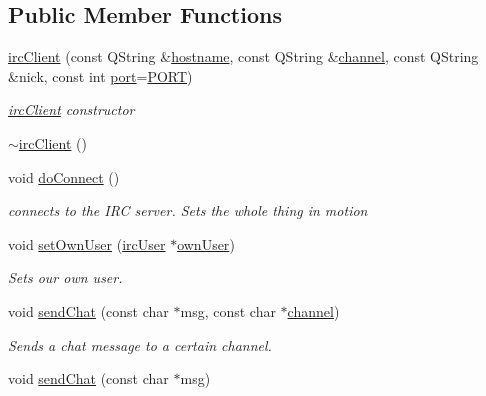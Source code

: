 \subsection*{Public Member Functions}
\begin{DoxyCompactItemize}
\item 
\hyperlink{classserver_1_1irc_client_a0f263c3a5ae9d82109842518b4866ab5}{irc\-Client} (const Q\-String \&\hyperlink{classserver_1_1irc_client_a8a5a50ebf84488f46df38bfba2c692bd}{hostname}, const Q\-String \&\hyperlink{classserver_1_1irc_client_a01d41f735fe9f0227b72e794c060a798}{channel}, const Q\-String \&nick, const int \hyperlink{classserver_1_1irc_client_a177e57fc5b5e19d591702644dd2a98e1}{port}=\hyperlink{ircclient_8h_a614217d263be1fb1a5f76e2ff7be19a2}{P\-O\-R\-T})
\begin{DoxyCompactList}\small\item\em \hyperlink{classserver_1_1irc_client}{irc\-Client} constructor \end{DoxyCompactList}\item 
\hyperlink{classserver_1_1irc_client_a4c82075fd5acb2f8fadfded3d9d3f21e}{$\sim$irc\-Client} ()
\item 
void \hyperlink{classserver_1_1irc_client_a43b0e50c5bf5ba76b5a09917e779c1ea}{do\-Connect} ()
\begin{DoxyCompactList}\small\item\em connects to the I\-R\-C server. Sets the whole thing in motion \end{DoxyCompactList}\item 
void \hyperlink{classserver_1_1irc_client_ac25cc917018cde96b0ba9e03b6f6022e}{set\-Own\-User} (\hyperlink{classserver_1_1irc_user}{irc\-User} $\ast$\hyperlink{classserver_1_1irc_client_afaf929882986b927133e126a495e3939}{own\-User})
\begin{DoxyCompactList}\small\item\em Sets our own user. \end{DoxyCompactList}\item 
void \hyperlink{classserver_1_1irc_client_a6b62de4b4dc3c1f7f0fe7c6f91c1cf05}{send\-Chat} (const char $\ast$msg, const char $\ast$\hyperlink{classserver_1_1irc_client_a01d41f735fe9f0227b72e794c060a798}{channel})
\begin{DoxyCompactList}\small\item\em Sends a chat message to a certain channel. \end{DoxyCompactList}\item 
void \hyperlink{classserver_1_1irc_client_aff095b9ea0faa07199be9edc474cffe6}{send\-Chat} (const char $\ast$msg)

\end{DoxyCompactItemize}
